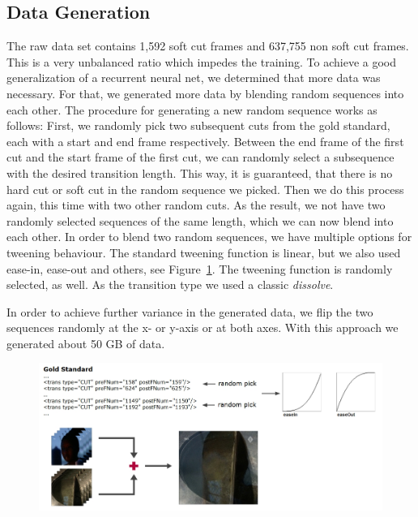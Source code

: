 \subsection{Data Generation}
\label{sec:soft_cut_data_generation}

The raw data set contains 1,592 soft cut frames and 637,755 non soft cut frames.
This is a very unbalanced ratio which impedes the training.
To achieve a good generalization of a recurrent neural net, we determined that more data was necessary.
For that, we generated more data by blending random sequences into each other.
The procedure for generating a new random sequence works as follows:
First, we randomly pick two subsequent cuts from the gold standard, each with a start and end frame respectively.
Between the end frame of the first cut and the start frame of the first cut, we can randomly select a subsequence with the desired transition length.
This way, it is guaranteed, that there is no hard cut or soft cut in the random sequence we picked.
Then we do this process again, this time with two other random cuts.
As the result, we not have two randomly selected sequences of the same length, which we can now blend into each other.
In order to blend two random sequences, we have multiple options for tweening behaviour.
The standard tweening function is linear, but we also used ease-in, ease-out and others, see Figure~\ref{fig:data_generation}.
The tweening function is randomly selected, as well.
As the transition type we used a classic \textit{dissolve}.

In order to achieve further variance in the generated data, we flip the two sequences randomly at the x- or y-axis or at both axes.
With this approach we generated about 50 GB of data.

\begin{figure}
    \centering
    \includegraphics[scale=.5]{images/data_generation.jpg}
    \caption{}
    \label{fig:data_generation}
\end{figure}
